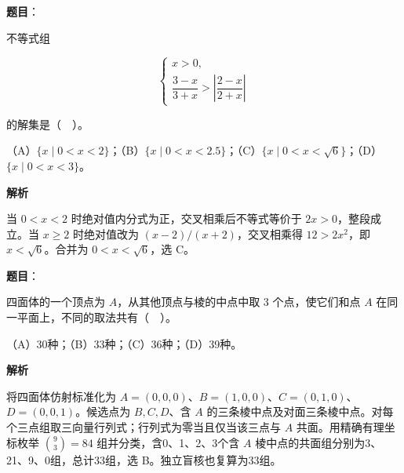 \begin{answer}

\textbf{题目}：

不等式组

\nopagebreak[4]
\[
\begin{cases}
x>0,\\
\dfrac{3-x}{3+x}>\left|\dfrac{2-x}{2+x}\right|
\end{cases}
\]

的解集是（　）。

（A）$\{x\mid0<x<2\}$；（B）$\{x\mid0<x<2.5\}$；（C）$\{x\mid0<x<\sqrt6\}$；（D）$\{x\mid0<x<3\}$。

\textbf{解析}

当 $0<x<2$ 时绝对值内分式为正，交叉相乘后不等式等价于 $2x>0$，整段成立。当 $x\ge2$ 时绝对值改为 $(x-2)/(x+2)$，交叉相乘得 $12>2x^2$，即 $x<\sqrt6$。合并为 $0<x<\sqrt6$，选 C。


\end{answer}
\begin{answer}

\textbf{题目}：

四面体的一个顶点为 $A$，从其他顶点与棱的中点中取 $3$ 个点，使它们和点 $A$ 在同一平面上，不同的取法共有（　）。

（A）30种；（B）33种；（C）36种；（D）39种。

\textbf{解析}

将四面体仿射标准化为 $A=(0,0,0)$、$B=(1,0,0)$、$C=(0,1,0)$、$D=(0,0,1)$。候选点为 $B,C,D$、含 $A$ 的三条棱中点及对面三条棱中点。对每个三点组取三向量行列式；行列式为零当且仅当该三点与 $A$ 共面。用精确有理坐标枚举 $\binom93=84$ 组并分类，含0、1、2、3个含 $A$ 棱中点的共面组分别为3、21、9、0组，总计33组，选 B。独立盲核也复算为33组。


\end{answer}

